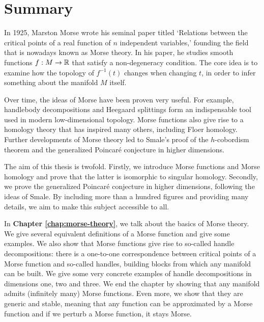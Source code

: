 \chapter*{Summary}
\label{ch:summary}

\vspace*{-1cm}
In 1925, Marston Morse wrote his seminal paper titled `Relations between the critical points of a real function of $n$ independent variables,' founding the field that is nowadays known as Morse theory.
In his paper, he studies smooth functions $f:M \to  \mathbb{R}$ that satisfy a non-degeneracy condition.
The core idea is to examine how the topology of $f^{-1}(t)$ changes when changing $t$, in order to infer something about the manifold $M$ itself.

Over time, the ideas of Morse have been proven very useful.
For example, handlebody decompositions and Heegaard splittings form an indispensable tool used in modern low-dimensional topology.
Morse functions also give rise to a homology theory that has inspired many others, including Floer homology.
Further developments of Morse theory led to Smale's proof of the $h$-cobordism theorem and the generalized Poincaré conjecture in higher dimensions.

The aim of this thesis is twofold.
Firstly, we introduce Morse functions and Morse homology and prove that the latter is isomorphic to singular homology.
Secondly, we prove the generalized Poincaré conjecture in higher dimensions, following the ideas of Smale.
By including more than a hundred figures and providing many details, we aim to make this subject accessible to all.



\bigskip
In \textbf{Chapter \ref{chap:morse-theory}}, we talk about the basics of Morse theory.
We give several equivalent definitions of a Morse function and give some examples.
We also show that Morse functions give rise to so-called handle decompositions: there is a one-to-one correspondence between critical points of a Morse function and so-called handles, building blocks from which any manifold can be built.
We give some very concrete examples of handle decompositions in dimensions one, two and three.
We end the chapter by showing that any manifold admits (infinitely many) Morse functions.
Even more, we show that they are generic and stable, meaning that any function can be approximated by a Morse function and if we perturb a Morse function, it stays Morse.

